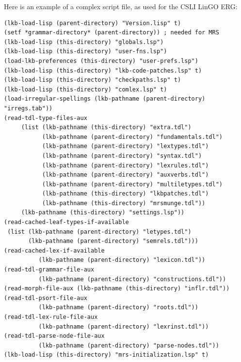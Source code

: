 \documentclass[12pt]{report}
\begin{document}
Here is an example of a complex script file, as used for
the CSLI LinGO ERG:
\begin{verbatim}
(lkb-load-lisp (parent-directory) "Version.lisp" t)
(setf *grammar-directory* (parent-directory)) ; needed for MRS
(lkb-load-lisp (this-directory) "globals.lsp")
(lkb-load-lisp (this-directory) "user-fns.lsp")
(load-lkb-preferences (this-directory) "user-prefs.lsp")
(lkb-load-lisp (this-directory) "lkb-code-patches.lsp" t)
(lkb-load-lisp (this-directory) "checkpaths.lsp" t)
(lkb-load-lisp (this-directory) "comlex.lsp" t)
(load-irregular-spellings (lkb-pathname (parent-directory) "irregs.tab"))
(read-tdl-type-files-aux
     (list (lkb-pathname (this-directory) "extra.tdl")
           (lkb-pathname (parent-directory) "fundamentals.tdl")
           (lkb-pathname (parent-directory) "lextypes.tdl")
           (lkb-pathname (parent-directory) "syntax.tdl")
           (lkb-pathname (parent-directory) "lexrules.tdl")
           (lkb-pathname (parent-directory) "auxverbs.tdl")
           (lkb-pathname (parent-directory) "multiletypes.tdl") 
           (lkb-pathname (this-directory) "lkbpatches.tdl")
           (lkb-pathname (this-directory) "mrsmunge.tdl"))
     (lkb-pathname (this-directory) "settings.lsp"))
(read-cached-leaf-types-if-available
 (list (lkb-pathname (parent-directory) "letypes.tdl")
       (lkb-pathname (parent-directory) "semrels.tdl")))
(read-cached-lex-if-available 
          (lkb-pathname (parent-directory) "lexicon.tdl"))
(read-tdl-grammar-file-aux 
          (lkb-pathname (parent-directory) "constructions.tdl"))
(read-morph-file-aux (lkb-pathname (this-directory) "inflr.tdl"))
(read-tdl-psort-file-aux 
          (lkb-pathname (parent-directory) "roots.tdl"))
(read-tdl-lex-rule-file-aux 
          (lkb-pathname (parent-directory) "lexrinst.tdl"))
(read-tdl-parse-node-file-aux 
          (lkb-pathname (parent-directory) "parse-nodes.tdl"))
(lkb-load-lisp (this-directory) "mrs-initialization.lsp" t)
\end{verbatim}
\end{document}

